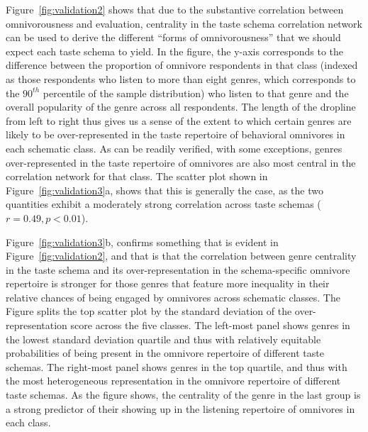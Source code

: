 \documentclass[preprint, authoryear,11pt, 3p]{elsarticle}
\begin{document}
Figure~\ref{fig:validation2} shows that due to the substantive correlation between omnivorousness and evaluation, centrality in the taste schema correlation network can be used to derive the different ``forms of omnivorousness'' that we should expect each taste schema to yield. In the figure, the y-axis corresponds to the difference between the proportion of omnivore respondents in that class (indexed as those respondents who listen to more than eight genres, which corresponds to the $90^{th}$ percentile of the sample distribution) who listen to that genre and the overall popularity of the genre across all respondents. The length of the dropline from left to right thus gives us a sense of the extent to which certain genres are likely to be over-represented in the taste repertoire of behavioral omnivores in each schematic class. As can be readily verified, with some exceptions, genres over-represented in the taste repertoire of omnivores are also most central in the correlation network for that class. The scatter plot shown in Figure~\ref{fig:validation3}a, shows that this is generally the case, as the two quantities exhibit a moderately strong correlation across taste schemas ($r=0.49, p<0.01$). 

Figure~\ref{fig:validation3}b, confirms something that is evident in Figure~\ref{fig:validation2}, and that is that the correlation between genre centrality in the taste schema and its over-representation in the schema-specific omnivore repertoire is stronger for those genres that feature more inequality in their relative chances of being engaged by omnivores across schematic classes. The Figure splits the top scatter plot by the standard deviation of the over-representation score across the five classes. The left-most panel shows genres in the lowest standard deviation quartile and thus with relatively equitable probabilities of being present in the omnivore repertoire of different taste schemas. The right-most panel shows genres in the top quartile, and thus with the most heterogeneous representation in the omnivore repertoire of different taste schemas. As the figure shows, the centrality of the genre in the last group is a strong predictor of their showing up in the listening repertoire of omnivores in each class. 
\end{document}
